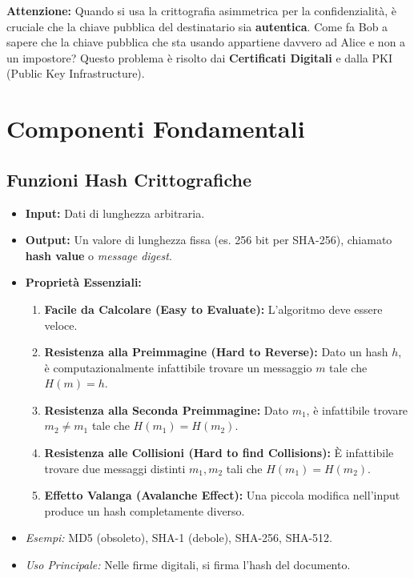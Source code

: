 \documentclass{article}
\begin{document}
\textbf{Attenzione:} Quando si usa la crittografia asimmetrica per la confidenzialità, è cruciale che la chiave pubblica del destinatario sia \textbf{autentica}. Come fa Bob a sapere che la chiave pubblica che sta usando appartiene davvero ad Alice e non a un impostore? Questo problema è risolto dai \textbf{Certificati Digitali} e dalla PKI (Public Key Infrastructure).

\section{Componenti Fondamentali}
\subsection{Funzioni Hash Crittografiche}
\begin{itemize}
    \item \textbf{Input:} Dati di lunghezza arbitraria.
    \item \textbf{Output:} Un valore di lunghezza fissa (es. 256 bit per SHA-256), chiamato \textbf{hash value} o \textit{message digest}.
    \item \textbf{Proprietà Essenziali:}
    \begin{enumerate}[label=\alph*)]
        \item \textbf{Facile da Calcolare (Easy to Evaluate):} L'algoritmo deve essere veloce.
        \item \textbf{Resistenza alla Preimmagine (Hard to Reverse):} Dato un hash $h$, è computazionalmente infattibile trovare un messaggio $m$ tale che $H(m) = h$.
        \item \textbf{Resistenza alla Seconda Preimmagine:} Dato $m_1$, è infattibile trovare $m_2 \neq m_1$ tale che $H(m_1) = H(m_2)$.
        \item \textbf{Resistenza alle Collisioni (Hard to find Collisions):} È infattibile trovare due messaggi distinti $m_1, m_2$ tali che $H(m_1) = H(m_2)$.
        \item \textbf{Effetto Valanga (Avalanche Effect):} Una piccola modifica nell'input produce un hash completamente diverso.
    \end{enumerate}
    \item \textit{Esempi:} MD5 (obsoleto), SHA-1 (debole), SHA-256, SHA-512.
    \item \textit{Uso Principale:} Nelle firme digitali, si firma l'hash del documento.
\end{itemize}
\end{document}

